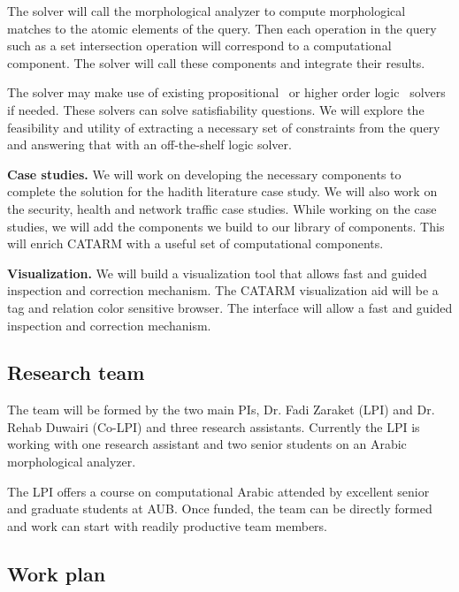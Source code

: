 \documentclass[12pt]{article}
\begin{document}
The solver will call the morphological analyzer to compute 
morphological matches to the atomic elements of the query. 
Then each operation in the query such as a set intersection
operation will correspond to a computational component. 
The solver will call these components and integrate their
results. 

The solver may make use of existing 
propositional~\cite{MiniSAT04} or
higher order logic~\cite{Z308} solvers if needed. 
These solvers can solve satisfiability questions.
We will explore the feasibility and utility 
of extracting a necessary set of 
constraints from the query and answering that with an off-the-shelf
logic solver. 

{\bf Case studies.}
We will work on developing the necessary components to complete 
the solution for the hadith literature  case study. 
We will also work on the security, health and network traffic case studies.
While working on the case studies, we will add the components
we build to our library of components. 
This will enrich CATARM with a useful set of computational 
components. 

{\bf Visualization.} 
We will build a visualization tool that allows fast 
and guided inspection and correction mechanism. 
The CATARM visualization aid will be a tag and relation color
sensitive browser.
The interface will allow a fast and guided inspection and 
correction mechanism.

\subsection{Research team}

The team will be formed by the two main PIs, Dr. Fadi Zaraket (LPI)
and Dr. Rehab Duwairi (Co-LPI) and three research assistants.
Currently the LPI is working with one research assistant 
and two senior students on an Arabic morphological analyzer. 

The LPI offers a course on computational Arabic attended
by excellent senior and graduate students at AUB. 
Once funded, the team can be directly formed and work can start
with readily productive team members. 

\subsection{Work plan}
\label{s:design:plan}
\end{document}
